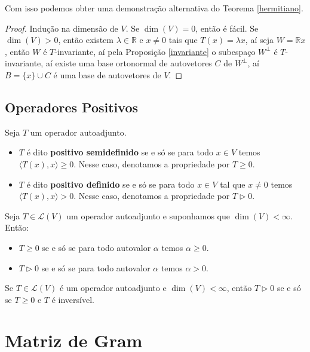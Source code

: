 \documentclass[11pt,twoside,a4paper]{book}
\begin{document}
\noindent
Com isso podemos obter uma demonstração alternativa do Teorema \ref{hermitiano}.

\begin{proof}
Indução na dimensão de $V$. Se $\dim(V)=0$, então é fácil. Se $\dim(V)>0$, então existem $\lambda\in\mathbb{R}$ e $x\neq 0$ tais que $T(x)=\lambda x$, aí seja $W=\mathbb{R}x$, então $W$ é $T$-invariante, aí pela Proposição \ref{invariante} o subespaço $W^\perp$ é $T$-invariante, aí existe uma base ortonormal de autovetores $C$ de $W^\perp$, aí $B=\{x\}\cup C$ é uma base de autovetores de $V$.
\end{proof}

\subsection{Operadores Positivos}

\begin{definicao}
Seja $T$ um operador autoadjunto.
\begin{itemize}
\item $T$ é dito \textbf{positivo semidefinido} se e só se para todo $x\in V$ temos $\langle T(x),x\rangle\geq 0.$ Nesse caso, denotamos a propriedade por $T\geq 0.$
\item $T$ é dito \textbf{positivo definido} se e só se para todo $x\in V$ tal que $x\neq 0$ temos $\langle T(x),x\rangle>0.$ Nesse caso, denotamos a propriedade por $T\rhd 0.$
\end{itemize} 
\end{definicao}

\begin{teorema}
Seja $T\in\mathcal{L}(V)$ um operador autoadjunto e suponhamos que $\dim(V)<\infty$. Então:
\begin{itemize}
\item $T\geq 0$ se e só se para todo autovalor $\alpha$ temos $\alpha\geq 0.$
\item $T\rhd 0$ se e só se para todo autovalor $\alpha$ temos $\alpha> 0.$
\end{itemize} 
\end{teorema}

\begin{corolario}
Se $T\in\mathcal{L}(V)$ é um operador autoadjunto e $\dim(V)<\infty$, então $T\rhd0$ se e só se $T\geq 0$ e $T$ é inversível.
\end{corolario}

\newpage

\section{Matriz de Gram}
\end{document}
